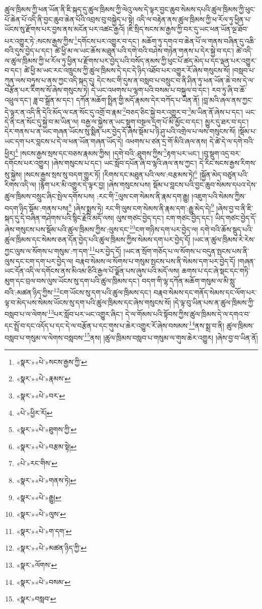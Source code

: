 ཚུལ་ཁྲིམས་ཀྱི་ཕན་ཡོན་ནི་ཇི་སྐད་དུ་ཚུལ་ཁྲིམས་ཀྱི་ལེའུ་ལས་དེ་ལྟར་བྱང་ཆུབ་སེམས་དཔའི་ཚུལ་ཁྲིམས་ཀྱི་ཕུང་པོ་ཆེན་པོ་འདི་ནི་བྱང་ཆུབ་ཆེན་པོའི་འབྲས་བུ་བསྐྱེད་པ་སྟེ། འདི་ལ་བརྟེན་ནས་ཚུལ་ཁྲིམས་ཀྱི་ཕ་རོལ་ཏུ་ཕྱིན་པ་ཡོངས་སུ་རྫོགས་པར་བྱས་ནས་མངོན་པར་འཚང་རྒྱའོ། །ཇི་སྲིད་སངས་མ་རྒྱས་ཀྱི་བར་དུ་ཡང་ཕན་ཡོན་ལྔ་ཐོབ་པར་འགྱུར་ཏེ་:སངས་རྒྱས་ཀྱིས་\footnote{«སྣར་»«པེ་»སངས་རྒྱས་ཀྱི་}དགོངས་པར་འགྱུར་བ་དང་། མཆོག་ཏུ་དགའ་བ་ཆེན་པོ་ལ་གནས་བཞིན་དུ་འཆི་བའི་དུས་བྱེད་པ་དང་། ཚེ་ཕྱི་མ་ལ་ཡང་ཆོས་མཐུན་པའི་དགེ་བའི་བཤེས་གཉེན་གནས་པ་དེར་སྐྱེ་བ་དང་། ཚེ་འདི་ལ་ཚུལ་ཁྲིམས་ཀྱི་ཕ་རོལ་ཏུ་ཕྱིན་པ་རྫོགས་པར་བྱེད་པའི་བསོད་ནམས་ཀྱི་ཕུང་པོ་ཚད་མེད་པ་དང་ལྡན་པར་འགྱུར་བ་དང་། ཚེ་ཕྱི་མ་ཡང་རང་འཁྲུངས་ཀྱི་ཚུལ་ཁྲིམས་དེ་དང་དེ་ཉིད་འཐོབ་པར་འགྱུར་རོ་ཞེས་གསུངས་སོ། །བསླབ་པ་ཀུན་ལས་བཏུས་པ་ནས་ཀྱང་འདི་སྐད་དུ། དེང་སང་གི་དུས་ན་བསླབ་པ་བསྲུང་བ་ནི་ཤིན་ཏུ་ཕན་ཡོན་ཆེ་བས་དེ་ལ་བརྩོན་པར་རིགས་སོ་ཞེས་གསུངས་ཏེ། དེ་ཡང་འཕགས་པ་ལྷག་པའི་བསམ་པ་བསྐུལ་བ་དང་། རབ་ཏུ་ཞི་བ་ཆོ་འཕྲུལ་དང་། ཟླ་བ་སྒྲོན་མ་དང་། དཀོན་མཆོག་སྤྲིན་གྱི་མདོ་རྣམས་དེར་བཀོད་པ་ཡིན་ནོ། །བླ་མའི་ཞལ་ནས་ཀྱང་དེ་ལྟར་ན་འདི་ནི་དེའི་མོད་ལ་ངན་སོང་དུ་འགྲོ་བ་རྣམ་\footnote{«སྣར་»«པེ་»རྣམས་}བཅད་ཅིང་སྐྱེ་བར་འགྱུར་བ་\footnote{«སྣར་»«པེ་»བར་}མ་ཡིན་ནོ་ཞེས་པ་དང་། ཡང་དེ་ནི་ངན་སོང་དུ་སྐྱེ་བ་མ་ཡིན་ལ། བརྒྱ་ལ་སྐྱེས་ན་ཡང་སྡུག་བསྔལ་དྲག་པོ་མི་མྱོང་བ་དང་། མྱུར་དུ་ཐར་བ་དང་། དེར་གནས་པ་ན་ཡང་གཞན་ཡོངས་སུ་སྨིན་པར་བྱེད་དོ་ཞེས་སྡོམ་པ་ཉི་ཤུ་པའི་འགྲེལ་པ་ལས་གསུངས་སོ། །སྡོམ་པ་ཡང་དག་པར་བླངས་པ་དེ་ལ་ཕན་ཡོན་གཞན་ཡོད་དེ། འཕགས་པ་ཙན་དྲ་གོ་མིའི་ཞལ་ནས། དེ་ཚེ་དེ་ལ་དགེ་བའི་ཕྱིར།\footnote{«པེ་»ཕྱིར་རོ།} །སངས་རྒྱས་སྲས་དང་བཅས་རྣམས་ཀྱིས། །དགེ་བའི་:ཐུགས་ཀྱིས་\footnote{«སྣར་»«པེ་»ཐུགས་ཀྱི་}རྟག་པར་ཡང་། །བུ་སྡུག་འདྲ་བར་དགོངས་པར་འགྱུར། །ཞེས་གསུངས་པ་དང་། ཡང་སློབ་དཔོན་ཞི་བ་ལྷའི་ཞལ་ནས་ཀྱང་། དེ་རིང་སངས་རྒྱས་རིགས་སུ་སྐྱེས། །སངས་རྒྱས་སྲས་སུ་བདག་གྱུར་ཏོ། །རིགས་དང་མཐུན་པའི་ལས་:བརྩམས་ཏེ།\footnote{«སྣར་»«པེ་»བརྩམ་སྟེ།} །སྐྱོན་མེད་བཙུན་པའི་རིགས་འདི་ལ། །རྙོག་པར་མི་འགྱུར་དེ་ལྟར་བྱ། །ཞེས་གསུངས་པས། སྡོམ་པ་བླངས་པའི་བྱང་ཆུབ་སེམས་དཔའ་དེས་ཚུལ་ཁྲིམས་བསྲུང་ཞིང་སྤེལ་དགོས་པས། :རང་གི་\footnote{«པེ་»རང་གིས་}ལུས་ངག་སེམས་ནི་རྣམ་དག་རྒྱུ། །འཇུག་པའི་སེམས་ཀྱིས་བདག་ཉིད་སྡོམ་:གནས་པས།\footnote{«སྣར་»«པེ་»གནས་ཏེ།} །ཞེས་སྨྲས་ཏེ། རང་གི་ལུས་ངག་སེམས་ནི་རྣམ་དག་:རྒྱུ་མེད་དེ།\footnote{«སྣར་»«པེ་»རྒྱུ།} །ཞེས་བྱ་བ་ནི་ཇི་སྐད་དུ་དེ་བཞིན་གཤེགས་པའི་སྙིང་རྗེའི་མདོ་ལས། ལུས་གཙང་བྱེད་དང་། ངག་གཙང་བྱེད་དང་། ཡིད་གཙང་བྱེད་དོ་ཞེས་གསུངས་པས་སྡོམ་པའི་ཚུལ་ཁྲིམས་ཀྱིས་:ལུས་དང་\footnote{«སྣར་»«པེ་»ལུས་}ངག་གཉིས་དག་པར་བྱེད་ལ། དགེ་བའི་ཆོས་སྡུད་པའི་ཚུལ་ཁྲིམས་དང་སེམས་ཅན་དོན་བྱེད་པའི་ཚུལ་ཁྲིམས་ཀྱིས་སེམས་དག་པར་བྱེད་དོ། །ཡང་ན་ཚུལ་ཁྲིམས་རེ་རེས་ཀྱང་ལུས་ལ་སོགས་པ་གསུམ་:ཀ་དག་\footnote{«སྣར་»«པེ་»ག་དག་}པར་བྱེད་དོ། །ཡང་ན་སྲོག་གཅོད་པ་ལ་སོགས་པ་བདུན་སྤངས་པས་ནི་ལུས་དང་ངག་དག་པར་བྱེད་ལ། བརྣབ་སེམས་ལ་སོགས་པ་གསུམ་སྤངས་པས་ནི་སེམས་དག་པར་བྱེད་དོ། །གཞན་ཡང་དོན་འདི་ལ་དགོངས་ནས་མིའམ་ཅིའི་རྒྱལ་པོ་ལྗོན་པས་ཞུས་པའི་མདོ་ལས། ཆགས་པ་དང་ཞེ་སྡང་དང་གཏི་མུག་དང་བྲལ་བས་ལུས་ཡོངས་སུ་དག་པའི་ཚུལ་ཁྲིམས་དང་། བདག་གི་ལྷ་དཀོན་མཆོག་གསུམ་ལ་མི་སླུ་བའི་:མཚན་ཉིད་ཀྱིས་\footnote{«སྣར་»«པེ་»མཚན་ཉིད་ཀྱི་}ངག་ཡོངས་སུ་དག་པའི་ཚུལ་ཁྲིམས་དང་། བརྣབ་སེམས་དང་གནོད་སེམས་དང་ལོག་པར་ལྟ་བ་མེད་པས་སེམས་ཡོངས་སུ་དག་པའི་ཚུལ་ཁྲིམས་དང་ཞེས་གསུངས་སོ། །དེ་ལྟ་བུ་ཡིན་པས་ན་ཚུལ་ཁྲིམས་ཀྱི་བསླབ་པ་ལ་ལེགས་\footnote{«སྣར་»ལོགས་}པར་སློབ་པར་ཡང་འགྱུར་ཞིང་། དེ་ལ་གོམས་པའི་སྟོབས་ཀྱིས་ཚུལ་ཁྲིམས་དེ་ལ་དགའ་བ་དང་སྤྲོ་བ་དང་འདོད་པ་དང་དེ་ལ་བརྩོན་པ་དང་གུས་པ་ཆེར་འགྱུར་རོ་ཞེས་བསམས་\footnote{«སྣར་»«པེ་»བསམ་}ནས་སྨྲ་བ་ནི། ཚུལ་ཁྲིམས་བསླབ་པ་གསུམ་ལ་ལེགས་བསླབས་\footnote{«སྣར་»བསླབ་}ནས། །ཚུལ་ཁྲིམས་བསླབ་པ་གསུམ་ལ་གུས་ཆེར་འགྱུར། །ཞེས་བྱ་བ་ཡིན་ནོ། 